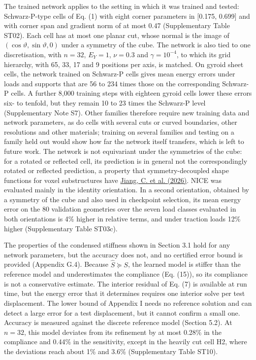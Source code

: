 \documentclass[preprint,12pt,authoryear]{elsarticle}
\begin{document}
The trained network applies to the setting in which it was trained and tested: Schwarz-P-type cells of Eq. (1) with eight corner parameters in {[}0.175, 0.699{]} and with corner span and gradient norm of at most 0.47 (Supplementary Table ST02). Each cell has at most one planar cut, whose normal is the image of \((\cos\vartheta,\sin\vartheta,0)\) under a symmetry of the cube. The network is also tied to one discretisation, with \(n=32\), \(E_Y=1\), \(\nu=0.3\) and \(\gamma=10^{-4}\), to which its grid hierarchy, with 65, 33, 17 and 9 positions per axis, is matched. On gyroid sheet cells, the network trained on Schwarz-P cells gives mean energy errors under loads and supports that are 56 to 234 times those on the corresponding Schwarz-P cells. A further 8,000 training steps with eighteen gyroid cells lower these errors six- to tenfold, but they remain 10 to 23 times the Schwarz-P level (Supplementary Note S7). Other families therefore require new training data and network parameters, as do cells with several cuts or curved boundaries, other resolutions and other materials; training on several families and testing on a family held out would show how far the network itself transfers, which is left to future work. The network is not equivariant under the symmetries of the cube: for a rotated or reflected cell, its prediction is in general not the correspondingly rotated or reflected prediction, a property that symmetry-decoupled shape functions for voxel substructures have \href{https://doi.org/10.1016/j.compstruct.2026.120865}{Jiang, C. et al. (2026)}. NICE was evaluated mainly in the identity orientation. In a second orientation, obtained by a symmetry of the cube and also used in checkpoint selection, its mean energy error on the 80 validation geometries over the seven load classes evaluated in both orientations is 4\% higher in relative terms, and under traction loads 12\% higher (Supplementary Table ST03c).

The properties of the condensed stiffness shown in Section 3.1 hold for any network parameters, but the accuracy does not, and no certified error bound is provided (Appendix G.4). Because \(\widehat S\succeq S\), the learned model is stiffer than the reference model and underestimates the compliance (Eq. (15)), so its compliance is not a conservative estimate. The interior residual of Eq. (7) is available at run time, but the energy error that it determines requires one interior solve per test displacement. The lower bound of Appendix I needs no reference solution and can detect a large error for a test displacement, but it cannot confirm a small one. Accuracy is measured against the discrete reference model (Section 5.2). At \(n=32\), this model deviates from its refinement by at most 0.28\% in the compliance and 0.44\% in the sensitivity, except in the heavily cut cell H2, where the deviations reach about 1\% and 3.6\% (Supplementary Table ST10).
\end{document}
